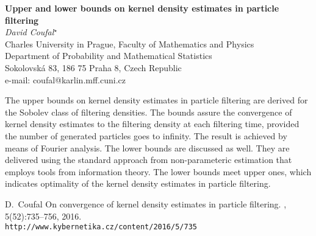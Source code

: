 \documentclass[12pt]{article}
\newcommand{\postertitle}[1]{{\Large\bf #1}\\[12pt]}
\newcommand{\authors}[1]{\emph{#1}\\}
\newcommand{\affiliations}[1]{{#1}\\}
\newcommand{\contacts}[1]{{#1}}
\begin{document}
\begin{center}
\vspace*{0.5cm}
%
\postertitle{Upper and lower bounds on kernel density estimates in particle filtering}
%
\authors{David Coufal$^\star$} %
% 
\affiliations{
Charles University in Prague, Faculty of Mathematics and Physics\\
Department of Probability and Mathematical Statistics\\
Sokolovsk\'{a} 83, 186 75 Praha 8, Czech Republic
}
%
\contacts{e-mail: coufal@karlin.mff.cuni.cz} %
%
\vspace*{0.3cm}
\end{center}

The upper bounds on kernel density estimates in particle filtering are derived for the Sobolev class of filtering densities. 
The bounds assure the convergence of kernel density estimates to the filtering density at each filtering time, provided 
the number of generated particles goes to infinity. The result is achieved by means of Fourier analysis. 
The lower bounds are discussed as well. They are delivered using the standard approach from non-parameteric
estimation that employs tools from information theory. The lower bounds meet upper ones, which indicates
optimality of the kernel density estimates in particle filtering.
\begin{thebibliography}{1}	
	D.~Coufal
	\newblock On convergence of kernel density estimates in particle filtering. 
	, 5(52):735--756, 2016.\\
	\newblock \texttt{http://www.kybernetika.cz/content/2016/5/735}
\end{thebibliography}
\end{document}
